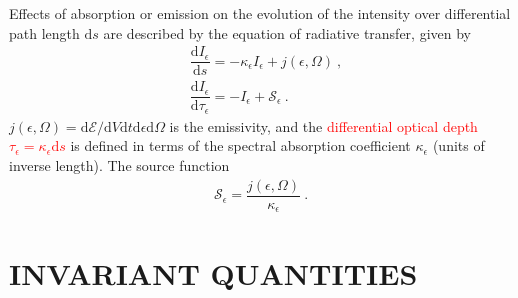 \documentclass[12pt,a4paper]{article}
\newcommand{\dif}{\mathrm{d}}
\begin{document}
Effects of absorption or emission on the evolution of the intensity over differential path length $\dif s$ are described by the equation of radiative transfer, given by
\begin{align}
& \dfrac{\dif I_\epsilon}{\dif s} = -\kappa_\epsilon I_\epsilon +j(\epsilon, \Omega) ~, \\
& \dfrac{\dif I_\epsilon}{\dif \tau_\epsilon} = -I_\epsilon + \mathcal S_\epsilon ~.
\end{align}
$j(\epsilon, \Omega) = \dif \mathcal{E}/\dif V \dif t \dif \epsilon \dif \Omega$ is the emissivity, and the \textcolor{red}{differential optical depth $\tau_\epsilon = \kappa_\epsilon \dif s$} is defined in terms of the spectral absorption coefficient $\kappa_\epsilon$ (units of inverse length). The source function
\begin{align}
\mathcal{S}_\epsilon = \dfrac{j(\epsilon, \Omega)}{\kappa_\epsilon} ~.
\end{align}




\section{INVARIANT QUANTITIES}
\cite{2009herb.book.....D} 
\end{document}
